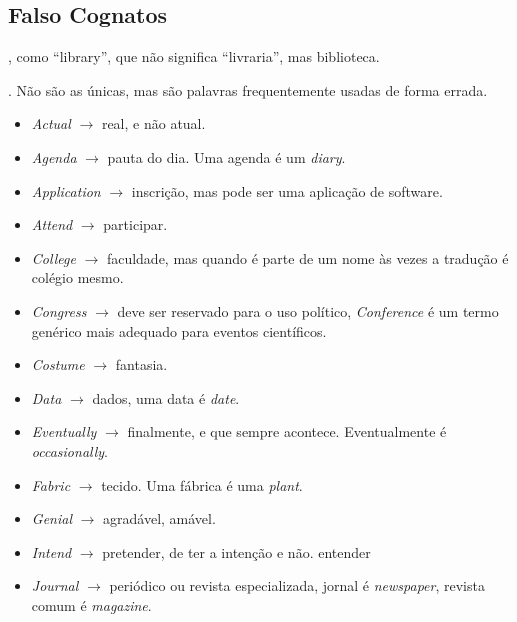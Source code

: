 \documentclass[openany]{book}
\begin{document}
\subsection{Falso Cognatos}

, como ``library'', que não significa ``livraria'', mas biblioteca.


. Não são as únicas, mas são palavras frequentemente usadas de forma errada.
\begin{itemize}
    \item \textit{Actual} $\rightarrow$ real, e não atual.
    \item \textit{Agenda} $\rightarrow$ pauta do dia. Uma agenda é um \textit{diary}.
    \item \textit{Application} $\rightarrow$ inscrição, mas pode ser uma aplicação de software.
    \item \textit{Attend} $\rightarrow$ participar.
    \item \textit{College} $\rightarrow$ faculdade, mas quando é parte de um nome às vezes a tradução é colégio mesmo.
    \item \textit{Congress} $\rightarrow$ deve ser reservado para o uso político, \textit{Conference} é um termo genérico mais adequado para eventos científicos.
    \item \textit{Costume} $\rightarrow$ fantasia.
    \item \textit{Data} $\rightarrow$ dados, uma data é \textit{date}.
    \item \textit{Eventually} $\rightarrow$ finalmente, e que sempre acontece. Eventualmente é \textit{occasionally}.
    \item \textit{Fabric} $\rightarrow$ tecido. Uma fábrica é uma \textit{plant}.
    \item \textit{Genial} $\rightarrow$ agradável, amável.
    \item \textit{Intend} $\rightarrow$ pretender, de ter a intenção e não. entender
    \item \textit{Journal} $\rightarrow$ periódico ou revista especializada, jornal é \textit{newspaper}, revista comum é \textit{magazine}.

\end{itemize}
\end{document}
